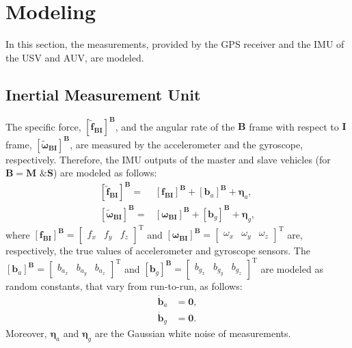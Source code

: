 \documentclass[3p]{elsarticle}
\begin{document}
\section{Modeling}\label{sec:model}
\noindent In this section, the measurements, provided by the GPS receiver and the IMU of the USV and AUV, are modeled.
\subsection{Inertial Measurement Unit}
\noindent The specific force,
\({{\left[\tilde{{\mathbf{f}}}_{\mathbf{BI}}\right]}}^{\mathbf{B}}\),
and the angular rate of the \(\mathbf{B}\) frame with respect to \(\mathbf{I}\) frame, \({\left[\tilde{\boldsymbol{\omega}}_{\mathbf{BI}}\right]}^{\mathbf{B}}\), are measured by the accelerometer and the gyroscope, respectively. Therefore, the IMU outputs of the master and slave vehicles
(for \(\mathbf{B} = \mathbf{M} \text{ \& } \mathbf{S}\))
are modeled as follows:
\begin{align}
	{{\left[\tilde{\mathbf{f}}_{\mathbf{BI}}\right]}}^{\mathbf{B}} =& {\left[\mathbf{f}_{\mathbf{BI}}\right]}^{\mathbf{B}} + {{\left[\mathbf{b}_{{a}}\right]}}^{\mathbf{B}} +\boldsymbol{\eta}_{{a}}, \\
	{{\left[\tilde{\boldsymbol{\omega}}_{\mathbf{BI}}\right]}}^{\mathbf{B}} =& {{\left[\boldsymbol{\omega}_{\mathbf{BI}}\right]}}^{\mathbf{B}} + {{\left[\mathbf{b}_{{g}}\right]}}^{\mathbf{B}} +\boldsymbol{\eta}_{{g}},
\end{align}
where \({{\left[\mathbf{f}_{\mathbf{BI}}\right]}}^{\mathbf{B}} = \begin{bmatrix}
	f_x & f_y & f_z
\end{bmatrix}^{\mathrm{T}}\) and \({{\left[\boldsymbol{\omega}_{\mathbf{BI}}\right]}}^{\mathbf{B}} = \begin{bmatrix}
	\omega_x & \omega_y & \omega_z
	\end{bmatrix}^{\mathrm{T}}\) are, respectively, the true values of accelerometer and gyroscope sensors. The \({\left[\mathbf{b}_{a}\right]}^{\mathbf{B}} = \begin{bmatrix}
		{b}_{a_{x}} & {b}_{a_{y}} & {b}_{a_{z}}
	\end{bmatrix}^{\mathrm{T}}\) and \({\left[\mathbf{b}_{g}\right]}^{\mathbf{B}} = \begin{bmatrix}
		{b}_{g_{x}} & {b}_{g_{y}} & {b}_{g_{z}}
	\end{bmatrix}^{\mathrm{T}}\) are modeled as random constants, that vary from run-to-run,  as follows:
	\begin{align}
		\dot{\mathbf{b}}_{a} &= \mathbf{0}, \\
		\dot{\mathbf{b}}_{g} &= \mathbf{0}.
	\end{align}
	Moreover, \(\boldsymbol{\eta}_{{a}}\) and \(\boldsymbol{\eta}_{{g}}\) are the Gaussian white noise of measurements.
\end{document}
